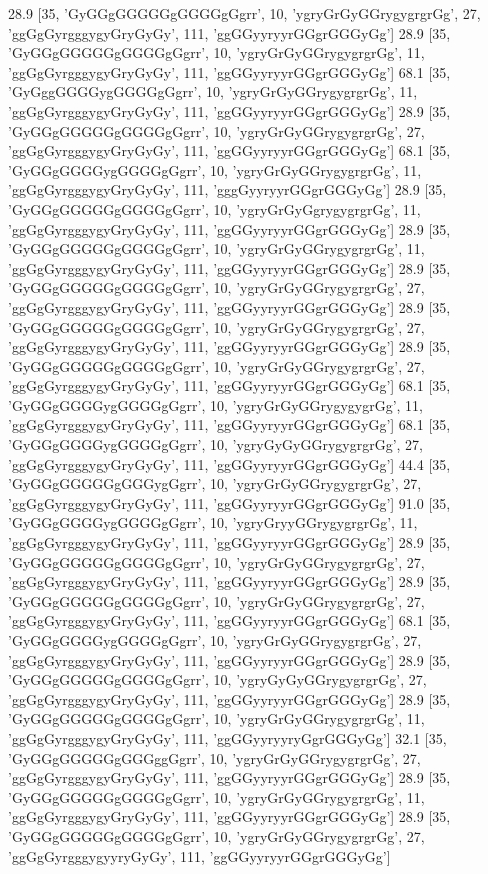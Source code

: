 28.9 [35, 'GyGGgGGGGGgGGGGgGgrr', 10, 'ygryGrGyGGrygygrgrGg', 27, 'ggGgGyrgggygyGryGyGy', 111, 'ggGGyyryyrGGgrGGGyGg']
28.9 [35, 'GyGGgGGGGGgGGGGgGgrr', 10, 'ygryGrGyGGrygygrgrGg', 11, 'ggGgGyrgggygyGryGyGy', 111, 'ggGGyyryyrGGgrGGGyGg']
68.1 [35, 'GyGggGGGGygGGGGgGgrr', 10, 'ygryGrGyGGrygygrgrGg', 11, 'ggGgGyrgggygyGryGyGy', 111, 'ggGGyyryyrGGgrGGGyGg']
28.9 [35, 'GyGGgGGGGGgGGGGgGgrr', 10, 'ygryGrGyGGrygygrgrGg', 27, 'ggGgGyrgggygyGryGyGy', 111, 'ggGGyyryyrGGgrGGGyGg']
68.1 [35, 'GyGGgGGGGygGGGGgGgrr', 10, 'ygryGrGyGGrygygrgrGg', 11, 'ggGgGyrgggygyGryGyGy', 111, 'gggGyyryyrGGgrGGGyGg']
28.9 [35, 'GyGGgGGGGGgGGGGgGgrr', 10, 'ygryGrGyGgrygygrgrGg', 11, 'ggGgGyrgggygyGryGyGy', 111, 'ggGGyyryyrGGgrGGGyGg']
28.9 [35, 'GyGGgGGGGGgGGGGgGgrr', 10, 'ygryGrGyGGrygygrgrGg', 11, 'ggGgGyrgggygyGryGyGy', 111, 'ggGGyyryyrGGgrGGGyGg']
28.9 [35, 'GyGGgGGGGGgGGGGgGgrr', 10, 'ygryGrGyGGrygygrgrGg', 27, 'ggGgGyrgggygyGryGyGy', 111, 'ggGGyyryyrGGgrGGGyGg']
28.9 [35, 'GyGGgGGGGGgGGGGgGgrr', 10, 'ygryGrGyGGrygygrgrGg', 27, 'ggGgGyrgggygyGryGyGy', 111, 'ggGGyyryyrGGgrGGGyGg']
28.9 [35, 'GyGGgGGGGGgGGGGgGgrr', 10, 'ygryGrGyGGrygygrgrGg', 27, 'ggGgGyrgggygyGryGyGy', 111, 'ggGGyyryyrGGgrGGGyGg']
68.1 [35, 'GyGGgGGGGygGGGGgGgrr', 10, 'ygryGrGyGGrygygygrGg', 11, 'ggGgGyrgggygyGryGyGy', 111, 'ggGGyyryyrGGgrGGGyGg']
68.1 [35, 'GyGGgGGGGygGGGGgGgrr', 10, 'ygryGyGyGGrygygrgrGg', 27, 'ggGgGyrgggygyGryGyGy', 111, 'ggGGyyryyrGGgrGGGyGg']
44.4 [35, 'GyGGgGGGGGgGGGygGgrr', 10, 'ygryGrGyGGrygygrgrGg', 27, 'ggGgGyrgggygyGryGyGy', 111, 'ggGGyyryyrGGgrGGGyGg']
91.0 [35, 'GyGGgGGGGygGGGGgGgrr', 10, 'ygryGryyGGrygygrgrGg', 11, 'ggGgGyrgggygyGryGyGy', 111, 'ggGGyyryyrGGgrGGGyGg']
28.9 [35, 'GyGGgGGGGGgGGGGgGgrr', 10, 'ygryGrGyGGrygygrgrGg', 27, 'ggGgGyrgggygyGryGyGy', 111, 'ggGGyyryyrGGgrGGGyGg']
28.9 [35, 'GyGGgGGGGGgGGGGgGgrr', 10, 'ygryGrGyGGrygygrgrGg', 27, 'ggGgGyrgggygyGryGyGy', 111, 'ggGGyyryyrGGgrGGGyGg']
68.1 [35, 'GyGGgGGGGygGGGGgGgrr', 10, 'ygryGrGyGGrygygrgrGg', 27, 'ggGgGyrgggygyGryGyGy', 111, 'ggGGyyryyrGGgrGGGyGg']
28.9 [35, 'GyGGgGGGGGgGGGGgGgrr', 10, 'ygryGyGyGGrygygrgrGg', 27, 'ggGgGyrgggygyGryGyGy', 111, 'ggGGyyryyrGGgrGGGyGg']
28.9 [35, 'GyGGgGGGGGgGGGGgGgrr', 10, 'ygryGrGyGGrygygrgrGg', 11, 'ggGgGyrgggygyGryGyGy', 111, 'ggGGyyryyryGgrGGGyGg']
32.1 [35, 'GyGGgGGGGGgGGGggGgrr', 10, 'ygryGrGyGGrygygrgrGg', 27, 'ggGgGyrgggygyGryGyGy', 111, 'ggGGyyryyrGGgrGGGyGg']
28.9 [35, 'GyGGgGGGGGgGGGGgGgrr', 10, 'ygryGrGyGGrygygrgrGg', 11, 'ggGgGyrgggygyGryGyGy', 111, 'ggGGyyryyrGGgrGGGyGg']
28.9 [35, 'GyGGgGGGGGgGGGGgGgrr', 10, 'ygryGrGyGGrygygrgrGg', 27, 'ggGgGyrgggygyyryGyGy', 111, 'ggGGyyryyrGGgrGGGyGg']
